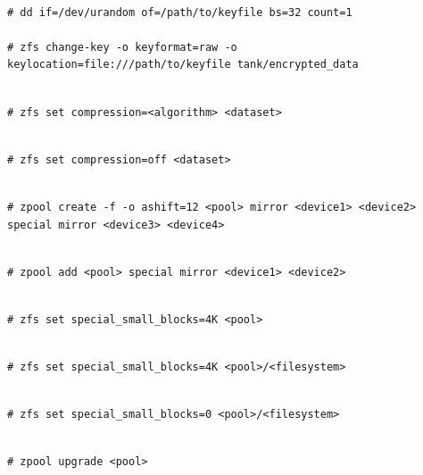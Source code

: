\begin{lstlisting}

# dd if=/dev/urandom of=/path/to/keyfile bs=32 count=1

# zfs change-key -o keyformat=raw -o keylocation=file:///path/to/keyfile tank/encrypted_data

\end{lstlisting}

\begin{lstlisting}

# zfs set compression=<algorithm> <dataset>

\end{lstlisting}

\begin{lstlisting}

# zfs set compression=off <dataset>

\end{lstlisting}

\begin{lstlisting}

# zpool create -f -o ashift=12 <pool> mirror <device1> <device2> special mirror <device3> <device4>

\end{lstlisting}

\begin{lstlisting}

# zpool add <pool> special mirror <device1> <device2>

\end{lstlisting}

\begin{lstlisting}

# zfs set special_small_blocks=4K <pool>

\end{lstlisting}

\begin{lstlisting}

# zfs set special_small_blocks=4K <pool>/<filesystem>

\end{lstlisting}

\begin{lstlisting}

# zfs set special_small_blocks=0 <pool>/<filesystem>

\end{lstlisting}

\begin{lstlisting}

# zpool upgrade <pool>

\end{lstlisting}

